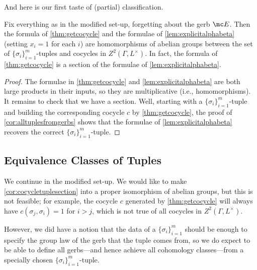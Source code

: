 \documentclass{article}
\numberwithin{equation}{section}
\begin{document}
And here is our first taste of (partial) classification.
\begin{cor} \label{cor:cocycletuplesection}
	Fix everything as in the modified set-up, forgetting about the gerb $\mc E$. Then the formula of \autoref{thm:getcocycle} and the formulae of \autoref{lem:explicitalphabeta} (setting $x_i=1$ for each $i$) are homomorphisms of abelian groups between the set of $\{\sigma_i\}_{i=1}^m$-tuples and cocycles in $Z^2(\Gamma,L^\times)$. In fact, the formula of \autoref{thm:getcocycle} is a section of the formulae of \autoref{lem:explicitalphabeta}.
\end{cor}
\begin{proof}
	The formulae in \autoref{thm:getcocycle} and \autoref{lem:explicitalphabeta} are both large products in their inputs, so they are multiplicative (i.e., homomorphisms). It remains to check that we have a section. Well, starting with a $\{\sigma_i\}_{i=1}^m$-tuple and building the corresponding cocycle $c$ by \autoref{thm:getcocycle}, the proof of \autoref{cor:alltuplesfromgerbs} shows that the formulae of \autoref{lem:explicitalphabeta} recovers the correct $\{\sigma_i\}_{i=1}^m$-tuple.
\end{proof}

\subsection{Equivalence Classes of Tuples}
We continue in the modified set-up. We would like to make \autoref{cor:cocycletuplesection} into a proper isomorphism of abelian groups, but this is not feasible; for example, the cocycle $c$ generated by \autoref{thm:getcocycle} will always have $c(\sigma_j,\sigma_i)=1$ for $i>j$, which is not true of all cocycles in $Z^2(\Gamma,L^\times)$.

However, we did have a notion that the data of a $\{\sigma_i\}_{i=1}^m$ should be enough to specify the group law of the gerb that the tuple comes from, so we do expect to be able to define all gerbs---and hence achieve all cohomology classes---from a specially chosen $\{\sigma_i\}_{i=1}^m$-tuple.
\end{document}
